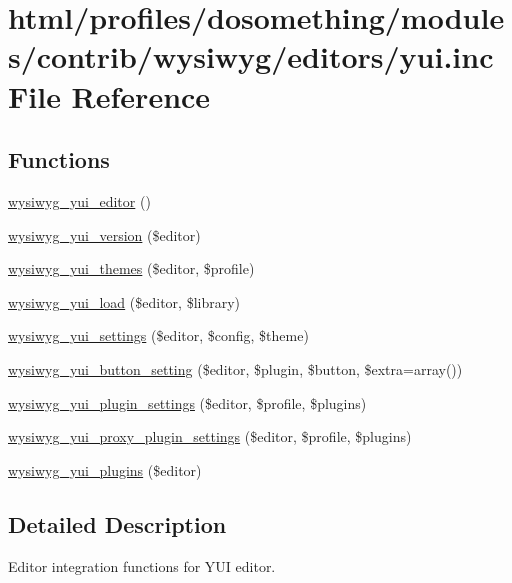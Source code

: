 \hypertarget{yui_8inc}{
\section{html/profiles/dosomething/modules/contrib/wysiwyg/editors/yui.inc File Reference}
\label{yui_8inc}
}
\subsection*{Functions}
\begin{DoxyCompactItemize}
\item 
\hyperlink{yui_8inc_a8305c21ebccac73e659a81258f0a033f}{wysiwyg\_\-yui\_\-editor} ()
\item 
\hyperlink{yui_8inc_aae999a8334aac1436876db8b3c20d78d}{wysiwyg\_\-yui\_\-version} (\$editor)
\item 
\hyperlink{yui_8inc_abd3af048178ed76c3d45a637b51ca837}{wysiwyg\_\-yui\_\-themes} (\$editor, \$profile)
\item 
\hyperlink{yui_8inc_aee9d025b17f5954b492eca89d50aa5cc}{wysiwyg\_\-yui\_\-load} (\$editor, \$library)
\item 
\hyperlink{yui_8inc_ac46735d17eceaea7833470b4408d0eb6}{wysiwyg\_\-yui\_\-settings} (\$editor, \$config, \$theme)
\item 
\hyperlink{yui_8inc_ace13fd2caec519fdb5baa809d7688241}{wysiwyg\_\-yui\_\-button\_\-setting} (\$editor, \$plugin, \$button, \$extra=array())
\item 
\hyperlink{yui_8inc_a33cbd26e67433dfe1067300cd9355262}{wysiwyg\_\-yui\_\-plugin\_\-settings} (\$editor, \$profile, \$plugins)
\item 
\hyperlink{yui_8inc_aca5a4d7d50e126e896bc35b629bb4143}{wysiwyg\_\-yui\_\-proxy\_\-plugin\_\-settings} (\$editor, \$profile, \$plugins)
\item 
\hyperlink{yui_8inc_a01692098e547ebef75d113a738852b4e}{wysiwyg\_\-yui\_\-plugins} (\$editor)
\end{DoxyCompactItemize}


\subsection{Detailed Description}
Editor integration functions for YUI editor. 

